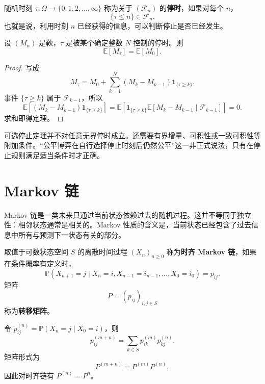 \begin{definition}[停时]
随机时刻 $\tau:\Omega\to\{0,1,2,\dots,\infty\}$ 称为关于 $(\mathcal{F}_n)$ 的\textbf{停时}，如果对每个 $n$，
\[
    \{\tau\leq n\}\in\mathcal{F}_n.
\]
也就是说，利用时刻 $n$ 已经获得的信息，可以判断停止是否已经发生。
\end{definition}

\begin{theorem}[有界停时的可选停止定理]
设 $(M_n)$ 是鞅，$\tau$ 是被某个确定整数 $N$ 控制的停时。则
\[
    \mathbb{E}[M_\tau]=\mathbb{E}[M_0].
\]
\end{theorem}

\begin{proof}
写成
\[
    M_\tau=M_0+\sum_{k=1}^N
    (M_k-M_{k-1})\mathbf{1}_{\{\tau\geq k\}}.
\]
事件 $\{\tau\geq k\}$ 属于 $\mathcal{F}_{k-1}$，所以
\[
\mathbb{E}[(M_k-M_{k-1})\mathbf{1}_{\{\tau\geq k\}}]
=\mathbb{E}\left[
\mathbf{1}_{\{\tau\geq k\}}
\mathbb{E}[M_k-M_{k-1}\mid\mathcal{F}_{k-1}]
\right]=0.
\]
求和即得定理。
\end{proof}

\begin{note}
可选停止定理并不对任意无界停时成立。还需要有界增量、可积性或一致可积性等附加条件。“公平博弈在自行选择停止时刻后仍然公平”这一非正式说法，只有在停止规则满足适当条件时才正确。
\end{note}

\section{Markov 链}

Markov 链是一类未来只通过当前状态依赖过去的随机过程。这并不等同于独立性：相邻状态通常是相关的。Markov 性质的含义是，当前状态已经包含了过去信息中所有与预测下一状态有关的部分。

\begin{definition}[时齐 Markov 链]
取值于可数状态空间 $S$ 的离散时间过程 $(X_n)_{n\geq0}$ 称为\textbf{时齐 Markov 链}，如果在条件概率有定义时，
\[
\mathbb{P}(X_{n+1}=j\mid X_n=i,X_{n-1}=i_{n-1},\dots,X_0=i_0)
=p_{ij}.
\]
矩阵
\[
    P=(p_{ij})_{i,j\in S}
\]
称为\textbf{转移矩阵}。
\end{definition}

\begin{proposition}
令 $p_{ij}^{(n)}=\mathbb{P}(X_n=j\mid X_0=i)$，则
\[
    p_{ij}^{(m+n)}=
    \sum_{k\in S}p_{ik}^{(m)}p_{kj}^{(n)}.
\]
矩阵形式为
\[
    P^{(m+n)}=P^{(m)}P^{(n)},
\]
因此对时齐链有 $P^{(n)}=P^n$。
\end{proposition}


